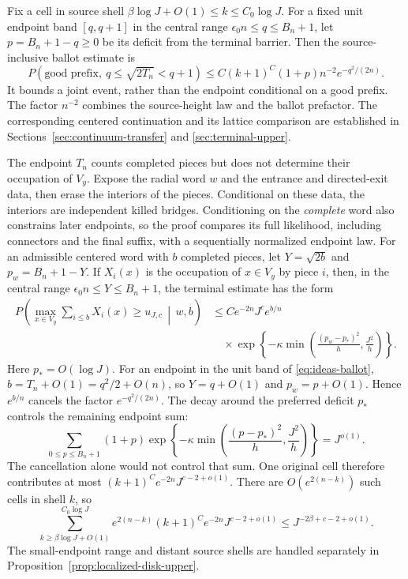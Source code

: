 Fix a cell in source shell
$\beta\log J+O(1)\le k\le C_0\log J$. For a fixed unit endpoint
band $[q,q+1]$ in the central range $\epsilon_0n\le q\le B_n+1$,
let $p=B_n+1-q\ge0$ be its deficit from the terminal barrier. Then
the source-inclusive ballot estimate is
\begin{equation}\label{eq:ideas-ballot}
 P(\text{good prefix},\ q\le\sqrt{2T_n}<q+1)
 \le C(k+1)^C(1+p)n^{-2}e^{-q^2/(2n)}.
\end{equation}
It bounds a joint event, rather than the endpoint conditional on a good
prefix. The factor $n^{-2}$ combines the source-height law and the ballot
prefactor. The corresponding centered continuation and its lattice
comparison are established in Sections~\ref{sec:continuum-transfer} and
\ref{sec:terminal-upper}.

The endpoint $T_n$ counts completed pieces but does not determine their
occupation of $V_y$. Expose the radial word $w$ and the entrance and
directed-exit data, then erase the interiors of the pieces. Conditional
on these data, the interiors are independent killed bridges. Conditioning
on the \emph{complete} word also constrains later endpoints, so the proof
compares its full likelihood, including connectors and the final suffix,
with a sequentially normalized endpoint law. For an admissible centered
word with $b$ completed pieces, let $Y=\sqrt{2b}$ and
$p_w=B_n+1-Y$. If $X_i(x)$ is the occupation of $x\in V_y$ by piece
$i$, then, in the central range $\epsilon_0n\le Y\le B_n+1$, the
terminal estimate has the form
\[
\begin{aligned}
 P\left(\max_{x\in V_y}\sum_{i\le b}X_i(x)\ge u_{J,c}
       \,\middle|\,w,b\right)
 &\le Ce^{-2n}J^c e^{b/n}\\
 &\quad\times\exp\left\{-\kappa\min\left(
      \frac{(p_w-p_*)^2}{h},\frac{J^2}{h}\right)\right\}.
\end{aligned}
\]
Here $p_*=O(\log J)$.
For an endpoint in the unit band of \eqref{eq:ideas-ballot},
$b=T_n+O(1)=q^2/2+O(n)$, so $Y=q+O(1)$ and $p_w=p+O(1)$.
Hence $e^{b/n}$ cancels the factor $e^{-q^2/(2n)}$. The decay around
the preferred deficit $p_*$ controls the remaining endpoint sum:
\[
 \sum_{0\le p\le B_n+1}(1+p)
 \exp\left\{-\kappa\min\left(\frac{(p-p_*)^2}{h},
                                   \frac{J^2}{h}\right)\right\}
 =J^{o(1)}.
\]
The cancellation alone would not control that sum. One original cell
therefore contributes at most $(k+1)^Ce^{-2n}J^{c-2+o(1)}$. There are
$O(e^{2(n-k)})$ such cells in shell $k$, so
\[
 \sum_{k\ge\beta\log J+O(1)}^{C_0\log J}
 e^{2(n-k)}(k+1)^Ce^{-2n}J^{c-2+o(1)}
 \le J^{-2\beta+c-2+o(1)}.
\]
The small-endpoint range and distant source
shells are handled separately in Proposition~\ref{prop:localized-disk-upper}.

